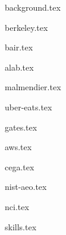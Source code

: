 \documentclass[11pt]{article}
\begin{document}
{background.tex}


{berkeley.tex}


{bair.tex}

{alab.tex}

{malmendier.tex}

{uber-eats.tex}

{gates.tex}

{aws.tex}

{cega.tex}

{nist-aeo.tex}

{nci.tex}


{skills.tex}
\end{document}
